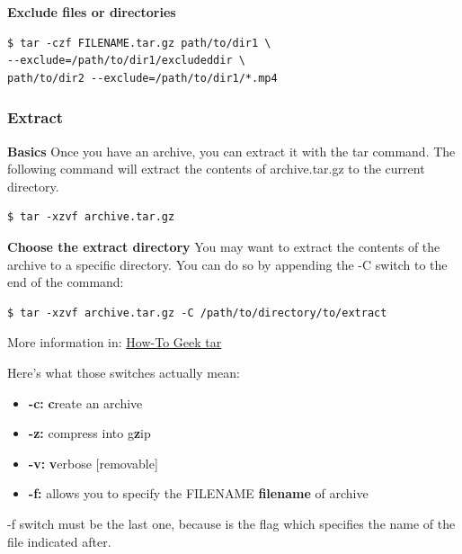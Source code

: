 \documentclass{article}
\newenvironment{blocktemplateIII}[1]{%
    \tcolorbox[beamer,%
    noparskip,breakable,
    ,colframe=Red,%
    colbacklower=LimeGreen!75!LightGreen,%
    title=#1]}%
    {\endtcolorbox}
\newenvironment{codetemplate}[1][]{%
  \mybasecolorbox[#1]
  \itshape
}{%
  \endmybasecolorbox
}
\begin{document}
\textbf{Exclude files or directories}
\begin{codetemplate}{}
\begin{verbatim}
$ tar -czf FILENAME.tar.gz path/to/dir1 \
--exclude=/path/to/dir1/excludeddir \
path/to/dir2 --exclude=/path/to/dir1/*.mp4
\end{verbatim}
\end{codetemplate}

\subsubsection{Extract}
\textbf{Basics}
\newline
Once you have an archive, you can extract it with the tar command. The following command will extract the contents of archive.tar.gz to the current directory.
\begin{codetemplate}{}
\begin{verbatim}
$ tar -xzvf archive.tar.gz
\end{verbatim}
\end{codetemplate}
\textbf{Choose the extract directory}
\newline
You may want to extract the contents of the archive to a specific directory. You can do so by appending the -C switch to the end of the command:
\begin{codetemplate}{}
\begin{verbatim}
$ tar -xzvf archive.tar.gz -C /path/to/directory/to/extract
\end{verbatim}
\end{codetemplate}

More information in: \href{https://www.howtogeek.com/248780/how-to-compress-and-extract-files-using-the-tar-command-on-linux/}{How-To Geek tar}

Here’s what those switches actually mean:

\begin{itemize}
    \item \textbf{-c:} \textbf{c}reate an archive
    \item \textbf{-z:} compress into g\textbf{z}ip
    \item \textbf{-v:} \textbf{v}erbose [removable]
    \item \textbf{-f:} allows you to specify the FILENAME \textbf{filename} of archive
\end{itemize}

\begin{blocktemplateIII}{Nota}
-f switch must be the last one, because is the flag which specifies the name of the file indicated after.
\end{blocktemplateIII}
\end{document}

